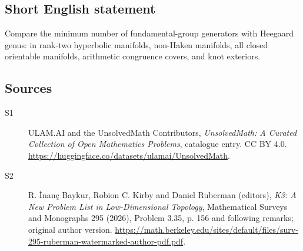 \documentclass[11pt]{article}
\begin{document}
\subsection{Short English statement}
Compare the minimum number of fundamental-group generators with Heegaard genus: in rank-two hyperbolic manifolds, non-Haken manifolds, all closed orientable manifolds, arithmetic congruence covers, and knot exteriors.
\subsection{Sources}
\begin{description}
\item[\hypertarget{source:statement:1}{S1}] ULAM.AI and the UnsolvedMath Contributors, \emph{UnsolvedMath: A Curated Collection of Open Mathematics Problems}, catalogue entry. CC BY 4.0. \url{https://huggingface.co/datasets/ulamai/UnsolvedMath}.
\item[\hypertarget{source:statement:2}{S2}] R. İnanç Baykur, Robion C. Kirby and Daniel Ruberman (editors), \emph{K3: A New Problem List in Low-Dimensional Topology}, Mathematical Surveys and Monographs 295 (2026), Problem 3.35, p. 156 and following remarks; original author version. \url{https://math.berkeley.edu/sites/default/files/surv-295-ruberman-watermarked-author-pdf.pdf}.
\end{description}
\label{end:statement}
\end{document}
